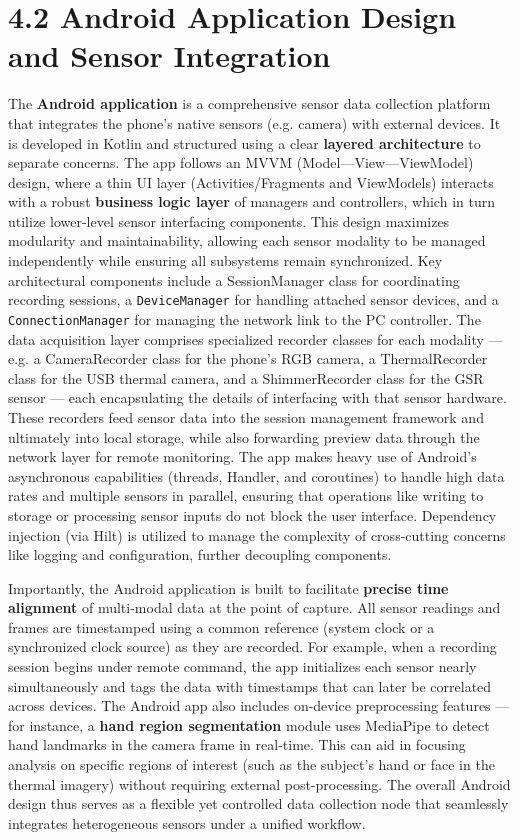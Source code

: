\documentclass[11pt,a4paper]{report}
\begin{document}
\section{4.2 Android Application Design and Sensor Integration}

The \textbf{Android application} is a comprehensive sensor data collection
platform that integrates the phone's native sensors (e.g. camera) with
external devices. It is developed in Kotlin and structured using a clear
\textbf{layered architecture} to separate concerns. The app follows an MVVM
(Model---View---ViewModel) design, where a thin UI layer
(Activities/Fragments and ViewModels) interacts with a robust \textbf{business
logic layer} of managers and controllers, which in turn utilize
lower-level sensor interfacing components. This design maximizes
modularity and maintainability, allowing each sensor modality to be
managed independently while ensuring all subsystems remain synchronized.
Key architectural components include a SessionManager class for coordinating
recording sessions, a \texttt{DeviceManager} for handling attached sensor
devices, and a \texttt{ConnectionManager} for managing the network link to the
PC
controller\cite{Fowles1981}.
The data acquisition layer comprises specialized recorder classes for
each modality --- e.g. a CameraRecorder class for the phone's RGB camera, a
ThermalRecorder class for the USB thermal camera, and a ShimmerRecorder class
for the GSR sensor --- each encapsulating the details of interfacing with
that sensor
hardware\cite{Healey2005}.
These recorders feed sensor data into the session management framework
and ultimately into local storage, while also forwarding preview data
through the network layer for remote monitoring. The app makes heavy use
of Android's asynchronous capabilities (threads, Handler, and
coroutines) to handle high data rates and multiple sensors in parallel,
ensuring that operations like writing to storage or processing sensor
inputs do not block the user interface. Dependency injection (via Hilt)
is utilized to manage the complexity of cross-cutting concerns like
logging and configuration, further decoupling components.

Importantly, the Android application is built to facilitate \textbf{precise
time alignment} of multi-modal data at the point of capture. All sensor
readings and frames are timestamped using a common reference (system
clock or a synchronized clock source) as they are recorded. For example,
when a recording session begins under remote command, the app
initializes each sensor nearly simultaneously and tags the data with
timestamps that can later be correlated across devices. The Android app
also includes on-device preprocessing features --- for instance, a \textbf{hand
region segmentation} module uses MediaPipe to detect hand landmarks in
the camera frame in
real-time\cite{Picard2001}.
This can aid in focusing analysis on specific regions of interest (such
as the subject's hand or face in the thermal imagery) without requiring
external post-processing. The overall Android design thus serves as a
flexible yet controlled data collection node that seamlessly integrates
heterogeneous sensors under a unified workflow.
\end{document}
